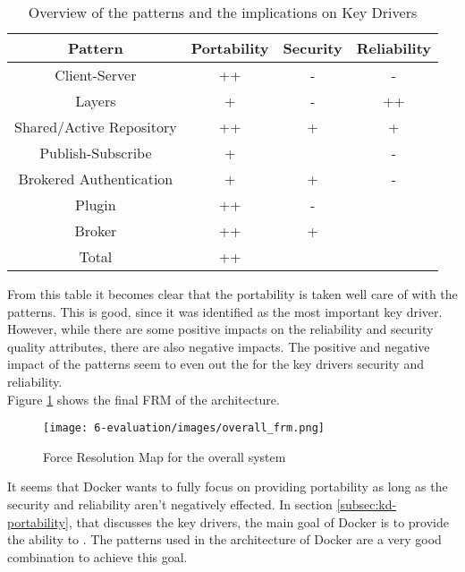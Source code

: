 \begin{center}
\begin{table}[H]
\label{tab:qa-overview}
\caption{Overview of the patterns and the implications on Key Drivers}
\begin{tabular}{|c|c|c|c|}
\hline \textbf{Pattern} & \textbf{Portability} & \textbf{Security} & \textbf{Reliability} \\ 
\hline Client-Server 					& ++ 	& - 	& - 	\\ 
\hline Layers 							& + 	& - 	& ++ 	\\ 
\hline Shared/Active Repository 		& ++ 	& + 	& + 	\\ 
\hline Publish-Subscribe 				& + 	& \s 	& - 	\\ 
\hline Brokered Authentication 			& + 	& + 	& - 	\\ 
\hline Plugin 							& ++ 	& - 	& \s 	\\ 
\hline Broker 							& ++ 	& + 	& \s 	\\ 
\hline Total							& ++   	& \s	& \s	\\
\hline
\end{tabular} 
\end{table}
\end{center}
 From this table it becomes clear that the portability is taken well care of with the patterns. This is good, since it was identified as the most important key driver.\\
However, while there are some positive impacts on the reliability and security quality attributes, there are also negative impacts. The  positive and negative impact of the patterns seem to even out the for the key drivers security and reliability.\\
Figure \ref{fig:eval-overall} shows the final FRM of the architecture.

\begin{figure}[H]
\centering
\texttt{[image: 6-evaluation/images/overall\_frm.png]}
\caption{Force Resolution Map for the overall system}
\label{fig:eval-overall}
\end{figure}

It seems that Docker wants to fully focus on providing portability as long as the security and reliability aren't negatively effected. In section \ref{subsec:kd-portability}, that discusses the key drivers, the main goal of Docker is to provide the ability to .  The patterns used in the architecture of Docker are a very good combination to achieve this goal.